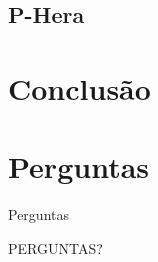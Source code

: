 \documentclass{beamer}
\begin{document}
\subsection{P-Hera}


\section{Conclusão}


\section{Perguntas}

\begin{frame}{Perguntas}
	\begin{center}		
		\Huge PERGUNTAS?
	\end{center}
	
\end{frame}
\end{document}
